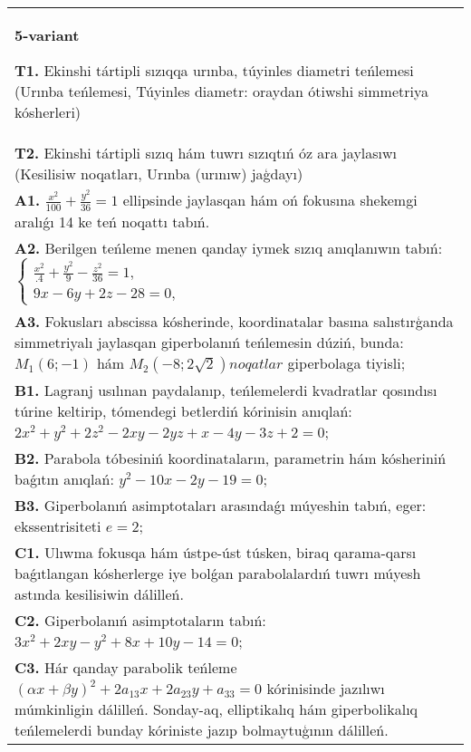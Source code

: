 \documentclass{article}
\begin{document}
\begin{tabular}{m{17cm}}
\textbf{5-variant}
\newline

\textbf{T1.} Ekinshi tártipli sızıqqa urınba, túyinles diametri teńlemesi (Urınba teńlemesi, Túyinles diametr: oraydan ótiwshi simmetriya kósherleri) \\
\textbf{T2.} Ekinshi tártipli sızıq hám tuwrı sızıqtıń óz ara jaylasıwı (Kesilisiw noqatları, Urınba (urınıw) jaģdayı) \\
\textbf{A1.} $\frac{x^2}{100}+\frac{y^2}{36}=1$ ellipsinde jaylasqan hám oń fokusına shekemgi aralıǵı 14 ke teń noqattı tabıń. \\
\textbf{A2.} Berilgen teńleme menen qanday iymek sızıq anıqlanıwın tabıń: $\left\{\begin{array}{l}\frac{x^2}{.4}+\frac{y^2}{9}-\frac{z^2}{36}=1, \\ 9 x-6 y+2 z-28=0,\end{array}\right.$ \\
\textbf{A3.} Fokusları abscissa kósherinde, koordinatalar basına salıstırģanda simmetriyalı jaylasqan giperbolanıń teńlemesin dúziń, bunda: $M_1 (6;-1) $ hám $M_2 (-8; 2 \sqrt{2}) noqatlar $ giperbolaga tiyisli; \\
\textbf{B1.} Lagranj usılınan paydalanıp, teńlemelerdi kvadratlar qosındısı túrine keltirip, tómendegi betlerdiń kórinisin anıqlań: $2 x^2+y^2+2 z^2-2 x y-2 y z+x-4 y-3 z+2=0$; \\
\textbf{B2.} Parabola tóbesiniń koordinataların, parametrin hám kósheriniń baǵıtın anıqlań: $y^2-10 x-2 y-19=0$; \\
\textbf{B3.} Giperbolanıń asimptotaları arasındaǵı múyeshin tabıń, eger: ekssentrisiteti $e=2$; \\
\textbf{C1.} Ulıwma fokusqa hám ústpe-úst túsken, biraq qarama-qarsı baǵıtlangan kósherlerge iye bolǵan parabolalardıń tuwrı múyesh astında kesilisiwin dálilleń. \\
\textbf{C2.} Giperbolanıń asimptotaların tabıń: $3 x^2+2 x y-y^2+8 x+10 y-14=0$; \\
\textbf{C3.} Hár qanday parabolik teńleme $ (\alpha x+\beta y) ^2+2a_{13}x+2a_{23}y+a_{33}=0$ kórinisinde jazılıwı múmkinligin dálilleń. Sonday-aq, elliptikalıq hám giperbolikalıq teńlemelerdi bunday kóriniste jazıp bolmaytuģının dálilleń. \\

\end{tabular}
\vspace{1cm}
\end{document}
